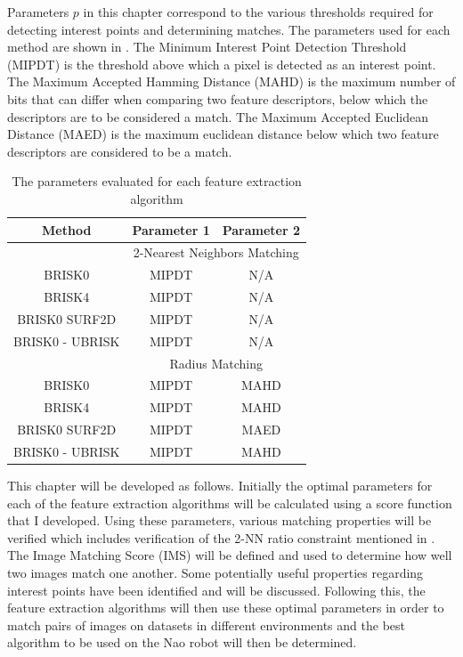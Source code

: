 \documentclass[11pt]{report}
\begin{document}
Parameters $p$ in this chapter correspond to the various thresholds required for detecting interest points and determining matches. The parameters used for each method are shown in . The Minimum Interest Point Detection Threshold (MIPDT) is the threshold above which a pixel is detected as an interest point. The Maximum Accepted Hamming Distance (MAHD) is the maximum number of bits that can differ when comparing two feature descriptors, below which the descriptors are to be considered a match. The Maximum Accepted Euclidean Distance (MAED) is the maximum euclidean distance below which two feature descriptors are considered to be a match.\\

\begin{table}
\caption{The parameters evaluated for each feature extraction algorithm}
\begin{tabular}{|c|c|c|}
\hline 
Method & Parameter 1 & Parameter 2\tabularnewline
\hline 
 & \multicolumn{2}{c}{2-Nearest Neighbors Matching}\tabularnewline
\hline 
BRISK0 & MIPDT & N/A\tabularnewline
\hline 
BRISK4 & MIPDT & N/A\tabularnewline
\hline 
BRISK0 SURF2D & MIPDT & N/A\tabularnewline
\hline 
BRISK0 - UBRISK & MIPDT & N/A\tabularnewline
\hline 
 & \multicolumn{2}{c}{Radius Matching}\tabularnewline
\hline 
BRISK0 & MIPDT & MAHD\tabularnewline
\hline 
BRISK4 & MIPDT & MAHD\tabularnewline
\hline 
BRISK0 SURF2D & MIPDT & MAED\tabularnewline
\hline 
BRISK0 - UBRISK & MIPDT & MAHD\tabularnewline
\hline 
\end{tabular}
\label{tab:parameters}
\end{table}

This chapter will be developed as follows. Initially the optimal parameters for each of the feature extraction algorithms will be calculated using a score function that I developed. Using these parameters, various matching properties will be verified which includes verification of the 2-NN ratio constraint mentioned in . The Image Matching Score (IMS) will be defined and used to determine how well two images match one another. Some potentially useful properties regarding interest points have been identified and will be discussed. Following this, the feature extraction algorithms will then use these optimal parameters in order to match pairs of images on datasets in different environments and the best algorithm to be used on the Nao robot will then be determined.\\   
\end{document}
